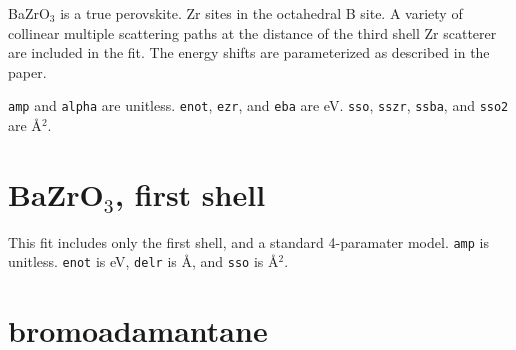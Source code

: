 \documentclass{article}
\let\stdsection\section
\renewcommand\section{\newpage\stdsection}
\begin{document}
BaZrO$_3$ is a true perovskite.  Zr sites in the octahedral B site.  A
variety of collinear multiple scattering paths at the distance of the
third shell Zr scatterer are included in the fit.  The energy shifts
are parameterized as described in the paper.

\texttt{amp} and \texttt{alpha} are unitless.  \texttt{enot},
\texttt{ezr}, and \texttt{eba} are eV.  \texttt{sso}, \texttt{sszr},
\texttt{ssba}, and \texttt{sso2} are \AA$^2$.


\renewcommand{\feffMaterial}{BaZrO3}
\renewcommand{\feffRone}{3}
\renewcommand{\feffRtwo}{4}
\renewcommand{\feffRthree}{5}
\renewcommand{\feffRfour}{5.5}
\renewcommand{\feffRfive}{6}
\renewcommand{\feffFirst}{}

\scriptsize

\scfsevenplots


\section{BaZrO$_3$, first shell}
\normalsize
This fit includes only the first shell, and a standard 4-paramater
model.  \texttt{amp} is unitless.  \texttt{enot} is eV, \texttt{delr}
is \AA, and \texttt{sso} is \AA$^2$.

\renewcommand{\feffFirst}{_1st}

\small

\scfsevenplots




% 





\section{bromoadamantane}
\normalsize
\end{document}
